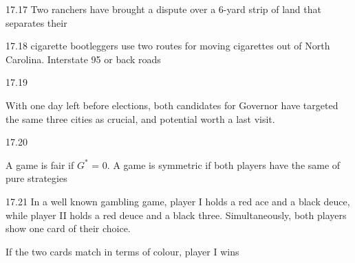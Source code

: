 17.17 Two ranchers have brought a dispute over a 6-yard strip of land that separates 
their


17.18 cigarette bootleggers use two routes for moving cigarettes out of North Carolina.
Interstate 95 or back roads



17.19

With one day left before elections, both candidates for Governor have targeted the same three 
cities as crucial, and potential worth a last visit.

17.20

A game is fair if $G^{\ast}$ = 0.
A game is symmetric if both players have the same of pure strategies


17.21
In a well known gambling game, player I holds a red ace and a black deuce, while player II holds
a red deuce and a black three.
Simultaneously, both players show one card of their choice.

If the two cards match in terms of colour, player 
I wins
